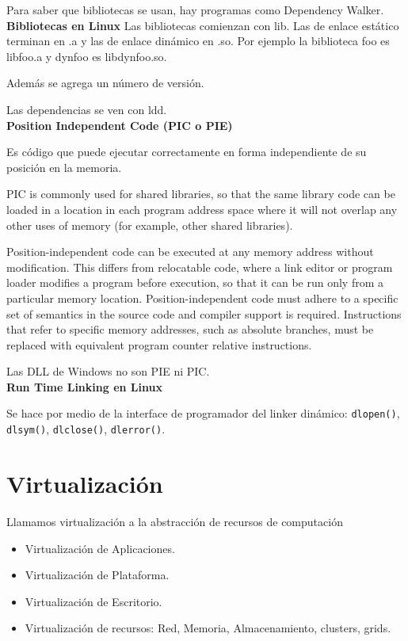 \documentclass[a4paper, twoside]{article}
\begin{document}
Para saber que bibliotecas se usan, hay programas como Dependency Walker.\\

\textbf{Bibliotecas en Linux}
Las bibliotecas comienzan con lib. Las de enlace estático terminan en .a y las de enlace dinámico en .so. Por ejemplo la biblioteca foo es libfoo.a y dynfoo es libdynfoo.so.

Además se agrega un número de versión.

Las dependencias se ven con ldd.\\

\textbf{Position Independent Code (PIC o PIE)}

Es código que puede ejecutar correctamente en forma independiente de su posición en la memoria.

PIC is commonly used for shared libraries, so that the same library code can be loaded in a location in each program address space where it will not overlap any other uses of memory (for example, other shared libraries).

Position-independent code can be executed at any memory address without modification. This differs from relocatable code, where a link editor or program loader modifies a program before execution, so that it can be run only from a particular memory location. Position-independent code must adhere to a specific set of semantics in the source code and compiler support is required. Instructions that refer to specific memory addresses, such as absolute branches, must be replaced with equivalent program counter relative instructions.

Las DLL de Windows no son PIE ni PIC.\\

\textbf{Run Time Linking en Linux}

Se hace por medio de la interface de programador del linker dinámico: \texttt{dlopen()}, \texttt{dlsym()}, \texttt{dlclose()}, \texttt{dlerror()}.

\newpage
\section{Virtualización}
Llamamos virtualización a la abstracción de recursos de computación
\begin{itemize}
	\item Virtualización de Aplicaciones.
	\item Virtualización de Plataforma.
	\item Virtualización de Escritorio.
	\item Virtualización de recursos: Red, Memoria, Almacenamiento, clusters, grids.
\end{itemize}
\end{document}
